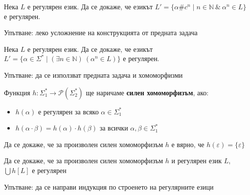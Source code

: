\begin{problem}
Нека $L$ е регулярен език. Да се докаже, че езикът $L' = \{ \alpha \# c^n \mid n \in \mathbb{N} \: \& \: \alpha^n \in L \}$ е регулярен.

Упътване: леко усложнение на конструкцията от предната задача
\end{problem}

\begin{problem}
Нека $L$ е регулярен език. Да се докаже, че езикът $L' = \{ \alpha \in \Sigma^* \mid (\exists n \in \mathbb{N}) \: (\alpha^n \in L) \}$ е регулярен.

Упътване: да се използват предната задача и хомоморфизми
\end{problem}

\begin{definition}
    Функция $h : \Sigma_1^* \rightarrow \mathcal{P}(\Sigma_2^*)$ ще наричаме \textbf{силен хомоморфизъм}, ако:
    \begin{itemize}
        \item $h(\alpha)$ е регулярен за всяко $\alpha \in \Sigma_1^*$
        \item $h(\alpha \cdot \beta) = h(\alpha) \cdot h(\beta)$ за всички $\alpha, \beta \in \Sigma_1^*$
    \end{itemize}
\end{definition}

\begin{problem}
Да се докаже, че за произволен силен хомоморфизъм $h$ е вярно, че $h(\varepsilon) = \{ \varepsilon \}$
\end{problem}

\begin{problem}
Да се докаже, че за произволен силен хомоморфизъм $h$ и регулярен език $L$, $\bigcup h[L]$ е регулярен

Упътване: да се направи индукция по строенето на регулярните езици
\end{problem}